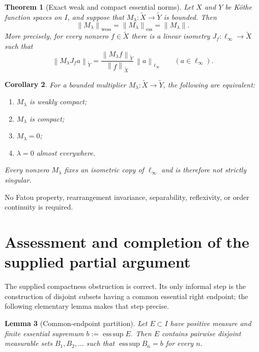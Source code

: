 \documentclass[11pt]{article}
\newtheorem{theorem}{Theorem}[section]
\newtheorem{lemma}[theorem]{Lemma}
\newtheorem{corollary}[theorem]{Corollary}
\theoremstyle{remark}
\newcommand{\esssup}{\operatorname*{ess\,sup}}
\newcommand{\tX}{\widetilde X}
\newcommand{\tY}{\widetilde Y}
\newcommand{\norm}[1]{\left\lVert #1\right\rVert}
\begin{document}
\begin{theorem}[Exact weak and compact essential norms]\label{thm:main}
Let $X$ and $Y$ be K\"othe function spaces on $I$, and suppose that
$M_\lambda:\tX\to\tY$ is bounded.  Then
\begin{equation}\label{eq:main}
 \norm{M_\lambda}_{\mathrm{wess}}
 =\norm{M_\lambda}_{\mathrm{ess}}
 =\norm{M_\lambda}.
\end{equation}
More precisely, for every nonzero $f\in\tX$ there is a linear isometry
$J_f:\ell_\infty\to\tX$ such that
\begin{equation}\label{eq:scaled-isometry}
 \norm{M_\lambda J_f a}_{\tY}
 =\frac{\norm{M_\lambda f}_{\tY}}{\norm{f}_{\tX}}\,
   \norm{a}_{\ell_\infty}
 \qquad(a\in\ell_\infty).
\end{equation}
\end{theorem}

\begin{corollary}\label{cor:characterization}
For a bounded multiplier $M_\lambda:\tX\to\tY$, the following are equivalent:
\begin{enumerate}[label=\textup{(\roman*)},nosep]
 \item $M_\lambda$ is weakly compact;
 \item $M_\lambda$ is compact;
 \item $M_\lambda=0$;
 \item $\lambda=0$ almost everywhere.
\end{enumerate}
Every nonzero $M_\lambda$ fixes an isometric copy of $\ell_\infty$ and is
therefore not strictly singular.
\end{corollary}

No Fatou property, rearrangement invariance, separability, reflexivity, or
order continuity is required.

\section{Assessment and completion of the supplied partial argument}

The supplied compactness obstruction is correct.  Its only informal step is
the construction of disjoint subsets having a common essential right
endpoint; the following elementary lemma makes that step precise.

\begin{lemma}[Common-endpoint partition]\label{lem:endpoint}
Let $E\subset I$ have positive measure and finite essential supremum
$b:=\esssup E$.  Then $E$ contains pairwise disjoint measurable sets
$B_1,B_2,\ldots$ such that $\esssup B_n=b$ for every $n$.
\end{lemma}
\end{document}

